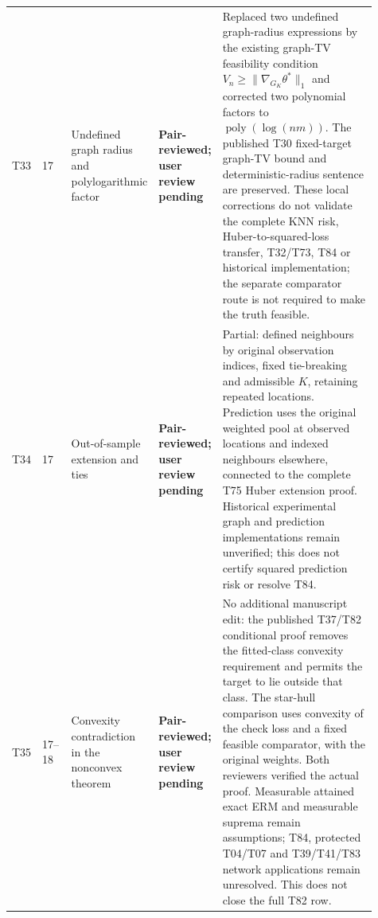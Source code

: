 \documentclass[10pt]{article}
\newcommand{\deferred}{\textcolor{deferredred}{\textbf{Deferred}}}
\newcommand{\pairreviewed}{\textcolor{deferredred}{\textbf{Pair-reviewed; user review pending}}}
\begin{document}
\begin{landscape}
\begin{longtable}{L{0.045\linewidth}L{0.08\linewidth}L{0.21\linewidth}L{0.13\linewidth}L{0.445\linewidth}}
T33 & 17 & Undefined graph radius and polylogarithmic factor & \pairreviewed &
\textcolor{deferredred}{Replaced two undefined graph-radius expressions by the
existing graph-TV feasibility condition $V_n\geq\|\nabla_{G_K}\theta^*\|_1$
and corrected two polynomial factors to $\operatorname{poly}(\log(nm))$.
The published T30 fixed-target graph-TV bound and deterministic-radius sentence
are preserved. These local corrections do not validate the complete KNN risk,
Huber-to-squared-loss transfer, T32/T73, T84 or historical implementation;
the separate comparator route is not required to make the truth feasible.}\\
T34 & 17 & Out-of-sample extension and ties & \pairreviewed &
\textcolor{deferredred}{Partial: defined neighbours by original observation indices,
fixed tie-breaking and admissible $K$, retaining repeated locations. Prediction
uses the original weighted pool at observed locations and indexed neighbours
elsewhere, connected to the complete T75 Huber extension proof.
Historical experimental graph and prediction implementations remain unverified;
this does not certify squared prediction risk or resolve T84.}\\
T35 & 17--18 & Convexity contradiction in the nonconvex theorem & \pairreviewed &
\textcolor{deferredred}{No additional manuscript edit: the published T37/T82
conditional proof removes the fitted-class convexity requirement and permits
the target to lie outside that class. The star-hull comparison uses convexity
of the check loss and a fixed feasible comparator, with the original weights.
Both reviewers verified the actual proof. Measurable attained exact ERM and
measurable suprema remain assumptions; T84, protected T04/T07 and T39/T41/T83
network applications remain unresolved. This does not close the full T82 row.}\\

\end{longtable}
\end{landscape}
\end{document}
